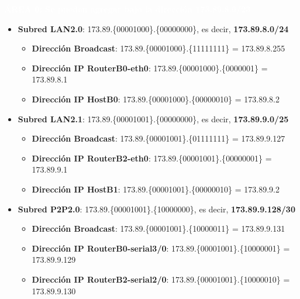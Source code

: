 \par \colorbox{marron}{\textbf{\textcolor{white}{ÁREA 0: Se pueden agregar bajo la dirección 173.89.8.0/23}}}
\begin{itemize}
	\item{\textbf{Subred LAN2.0}:} 173.89.\{\textcolor{azul}{000010}\textcolor{rojo}{00}\}.\{00000000\}, es decir, \textbf{173.89.8.0/24}
		\begin{itemize}
			\item{\textbf{Dirección Broadcast}}: 173.89.\{\textcolor{azul}{000010}\textcolor{rojo}{00}\}.\{11111111\} = 173.89.8.255
			\item{\textbf{Dirección IP RouterB0-eth0}}: 173.89.\{\textcolor{azul}{000010}\textcolor{rojo}{00}\}.\{0000001\} = 173.89.8.1
			\item{\textbf{Dirección IP HostB0}}: 173.89.\{\textcolor{azul}{000010}\textcolor{rojo}{00}\}.\{00000010\} = 173.89.8.2
		\end{itemize}
	\item{\textbf{Subred LAN2.1}:} 173.89.\{\textcolor{azul}{000010}\textcolor{rojo}{01}\}.\{\textcolor{rojo}{0}0000000\}, es decir, \textbf{173.89.9.0/25}
		\begin{itemize}
			\item{\textbf{Dirección Broadcast}}: 173.89.\{\textcolor{azul}{000010}\textcolor{rojo}{01}\}.\{\textcolor{rojo}{0}1111111\} = 173.89.9.127
			\item{\textbf{Dirección IP RouterB2-eth0}}: 173.89.\{\textcolor{azul}{000010}\textcolor{rojo}{01}\}.\{\textcolor{rojo}{0}0000001\} = 173.89.9.1
			\item{\textbf{Dirección IP HostB1}}: 173.89.\{\textcolor{azul}{000010}\textcolor{rojo}{01}\}.\{\textcolor{rojo}{0}0000010\} = 173.89.9.2
		\end{itemize}
	\item{\textbf{Subred P2P2.0}:} 173.89.\{\textcolor{azul}{000010}\textcolor{rojo}{01}\}.\{\textcolor{rojo}{100000}00\}, es decir, \textbf{173.89.9.128/30}
		\begin{itemize}
			\item{\textbf{Dirección Broadcast}}: 173.89.\{\textcolor{azul}{000010}\textcolor{rojo}{01}\}.\{\textcolor{rojo}{100000}11\} = 173.89.9.131
			\item{\textbf{Dirección IP RouterB0-serial3/0}}: 173.89.\{\textcolor{azul}{000010}\textcolor{rojo}{01}\}.\{\textcolor{rojo}{100000}01\} = 173.89.9.129
			\item{\textbf{Dirección IP RouterB2-serial2/0}}: 173.89.\{\textcolor{azul}{000010}\textcolor{rojo}{01}\}.\{\textcolor{rojo}{100000}10\} = 173.89.9.130

\end{itemize}
\end{itemize}
